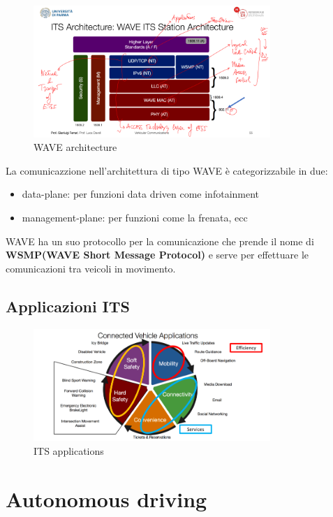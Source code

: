 \begin{figure}[!ht]
  \centering
  \includegraphics[width=0.8\textwidth]{./images/wave_architecture.png}
  \caption{WAVE architecture}
  \label{fig:wave_architecture}
\end{figure}


La comunicazzione nell'architettura di tipo WAVE è categorizzabile in due:
\begin{itemize}
  \item data-plane: per funzioni data driven come infotainment
  \item management-plane: per funzioni come la frenata, ecc
\end{itemize}

WAVE ha un suo protocollo per la comunicazione che prende il nome di \textbf{WSMP(WAVE Short Message Protocol)} e serve per effettuare le comunicazioni tra veicoli in movimento.


\subsection{Applicazioni ITS}

\begin{figure}[!ht]
  \centering
  \includegraphics[width=0.8\textwidth]{./images/its_apps.png}
  \caption{ITS applications}
  \label{fig:its_apps}
\end{figure}


\section{Autonomous driving}
